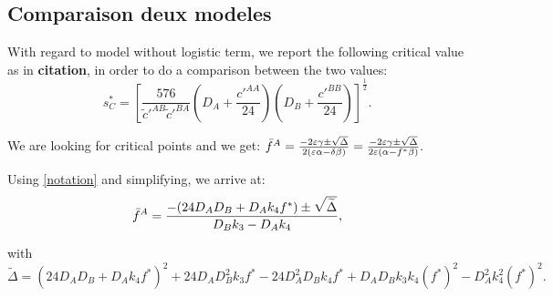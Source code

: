 \subsection{Comparaison deux modeles}

With regard to model without logistic term, we report the following critical value as in \textbf{citation}, in order to do a comparison between the two values: 
$$ s^{*}_{C}= \left[\frac{576}{\tilde{c}'^{AB} \tilde{c}'^{BA}} \left( D_A+\frac{c'^{AA}}{24} \right) \left(D_B+\frac{c'^{BB}}{24} \right) \right]^{\frac{1}{2}}. $$

%              
% 
We are looking for critical points and we get:
${\bar{f}^A}= \frac{-2\varepsilon {\gamma} \pm \sqrt{\Delta}}{2(\varepsilon {\alpha}-{\delta}{\beta})}=\frac{-2\varepsilon {\gamma} \pm \sqrt{\Delta}}{2\varepsilon ({\alpha}-f^{*}{\beta})}.$

 Using \eqref{notation} and simplifying, we arrive at: 
\begin{equation}
{\bar{f}^A}=\frac{-(24 D_AD_B+D_Ak_4f^{*}) \pm \sqrt{\widetilde{\Delta}}}{D_Bk_3-D_Ak_4}, 
\end{equation}

with $\widetilde{\Delta}=(24D_AD_B+D_Ak_4f^{*})^2+24D_AD_B^{2}k_3f^{*}-24D_A^2D_Bk_4f^{*}+D_A D_B k_3 k_4(f^{*})^{2}-D_A^{2} k_4^2 (f^{*})^2.  $

